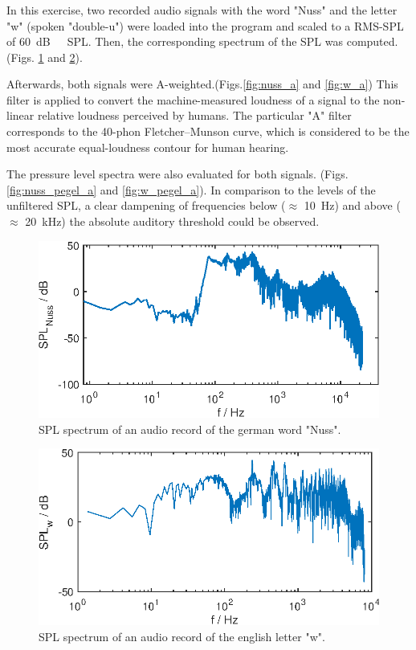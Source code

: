 \clearpage
\subsubsection{}
In this exercise, two recorded audio signals with the word "Nuss" and the letter "w" (spoken "double-u") were loaded into the program and scaled to a RMS-SPL of \SI{60}{dB\ SPL}. Then, the corresponding spectrum of the SPL was computed. (Figs. \ref{fig:nuss_pegel} and \ref{fig:w_pegel}). 

Afterwards, both signals were A-weighted.(Figs.\ref{fig:nuss_a} and \ref{fig:w_a}) This filter is applied to convert the machine-measured loudness of a signal to the non-linear relative loudness perceived by humans. The particular "A" filter corresponds to the 40-phon Fletcher–Munson curve, which is considered to be the most accurate equal-loudness contour for human hearing.

The pressure level spectra were also evaluated for both signals. (Figs. \ref{fig:nuss_pegel_a} and \ref{fig:w_pegel_a}). In comparison to the levels of the unfiltered SPL, a clear dampening of frequencies below ($\approx$ \SI{10}{\Hz}) and above ($\approx$ \SI{20}{\kilo\Hz}) the absolute auditory threshold could be observed.
\clearpage
\begin{figure}[h] 
  \centering
  \includegraphics[width=.9\linewidth]{ue2/nuss_pegel.eps} %
  \caption{SPL spectrum of an audio record of the german word "Nuss".}
  \label{fig:nuss_pegel}
\end{figure}

\begin{figure}[h] 
  \centering
  \includegraphics[width=.9\linewidth]{ue2/w_pegel.eps} %
  \caption{SPL spectrum of an audio record of the english letter "w".}
  \label{fig:w_pegel}
\end{figure}

